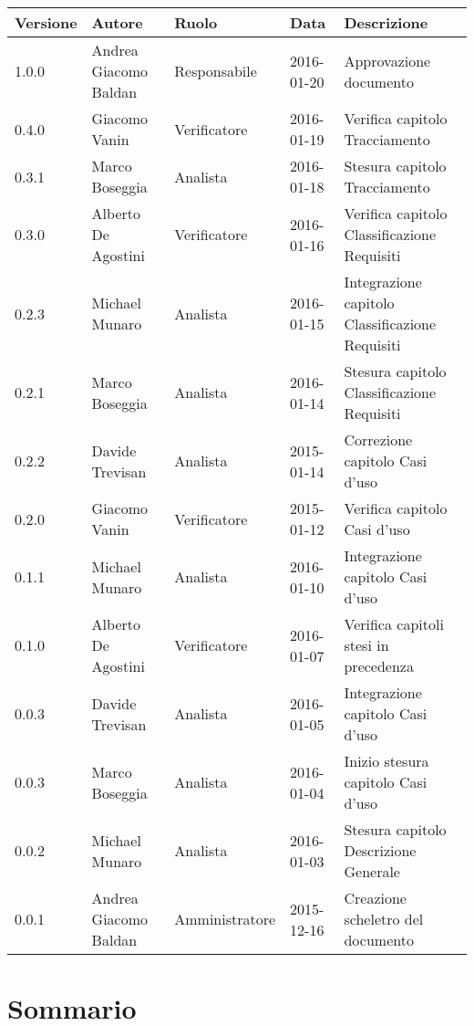 \documentclass{scalatekids-article}
\begin{document}
\begin{center}
  \begin{tabular}{| l | l | l | l | l |}
    \hline
    Versione & Autore & Ruolo & Data & Descrizione \\
    \hline
    1.0.0 & Andrea Giacomo Baldan & Responsabile & 2016-01-20 & Approvazione documento\\
    \hline
    0.4.0 & Giacomo Vanin & Verificatore & 2016-01-19 & Verifica capitolo Tracciamento\\
    \hline
    0.3.1 & Marco Boseggia & Analista & 2016-01-18 & Stesura capitolo Tracciamento\\
    \hline
    0.3.0 & Alberto De Agostini & Verificatore & 2016-01-16 & Verifica capitolo Classificazione Requisiti\\
    \hline
    0.2.3 & Michael Munaro & Analista & 2016-01-15 & Integrazione capitolo Classificazione Requisiti\\
    \hline
    0.2.1 & Marco Boseggia & Analista & 2016-01-14 & Stesura capitolo Classificazione Requisiti\\
    \hline
    0.2.2 & Davide Trevisan & Analista & 2015-01-14 & Correzione capitolo Casi d'uso\\ 
    \hline
    0.2.0 & Giacomo Vanin & Verificatore & 2015-01-12 & Verifica capitolo Casi d'uso\\
    \hline
    0.1.1 & Michael Munaro & Analista & 2016-01-10 & Integrazione capitolo Casi d'uso\\
    \hline
    0.1.0 & Alberto De Agostini & Verificatore & 2016-01-07 & Verifica capitoli stesi in precedenza\\
    \hline
    0.0.3 & Davide Trevisan & Analista & 2016-01-05 & Integrazione capitolo Casi d'uso\\
    \hline
    0.0.3 & Marco Boseggia & Analista & 2016-01-04 & Inizio stesura capitolo Casi d'uso\\
    \hline
    0.0.2 & Michael Munaro & Analista & 2016-01-03 & Stesura capitolo Descrizione Generale\\
    \hline
    0.0.1 & Andrea Giacomo Baldan & Amministratore & 2015-12-16 & Creazione scheletro del documento\\
    \hline
  \end{tabular}
\end{center}
\tableofcontents
\listoftables
\listoffigures
\newpage
{}
\section{Sommario}
\end{document}
